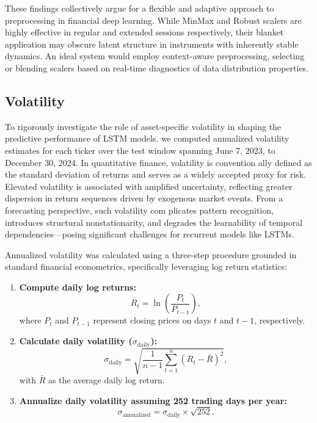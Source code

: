 \documentclass[letterpaper]{article}
\begin{document}
These findings collectively argue for a flexible and adaptive approach to preprocessing in financial deep learning. While MinMax and Robust scalers are highly effective in regular and extended sessions respectively, their blanket application may obscure latent structure in instruments with inherently stable dynamics. An ideal system would employ context-aware preprocessing, selecting or blending scalers based on real-time diagnostics of data distribution properties.

\subsection{Volatility}

To rigorously investigate the role of asset-specific volatility in shaping the predictive performance
of LSTM models, we computed annualized volatility estimates for each ticker over the test window
spanning June 7, 2023, to December 30, 2024. In quantitative finance, volatility is convention
ally defined as the standard deviation of returns and serves as a widely accepted proxy for risk.
Elevated volatility is associated with amplified uncertainty, reflecting greater dispersion in return
sequences driven by exogenous market events. From a forecasting perspective, such volatility com
plicates pattern recognition, introduces structural nonstationarity, and degrades the learnability
of temporal dependencies—posing significant challenges for recurrent models like LSTMs.

Annualized volatility was calculated using a three-step procedure grounded in standard financial
 econometrics, specifically leveraging log return statistics:

\begin{enumerate}
    \item \textbf{Compute daily log returns:}
    \begin{equation}
    R_t = \ln\left(\frac{P_t}{P_{t-1}}\right),
    \end{equation}
    where \(P_t\) and \(P_{t-1}\) represent closing prices on days \(t\) and \(t-1\), respectively.


    
    \item \textbf{Calculate daily volatility (\(\sigma_{\text{daily}}\)):}
    \begin{equation}
    \sigma_{\text{daily}} = \sqrt{\frac{1}{n-1}\sum_{t=1}^{n}(R_t - \bar{R})^2},
    \end{equation}
    with \(\bar{R}\) as the average daily log return.

    \item \textbf{Annualize daily volatility assuming 252 trading days per year:}
    \begin{equation}
    \sigma_{\text{annualized}} = \sigma_{\text{daily}} \times \sqrt{252}.
    \end{equation}
\end{enumerate}
\end{document}
